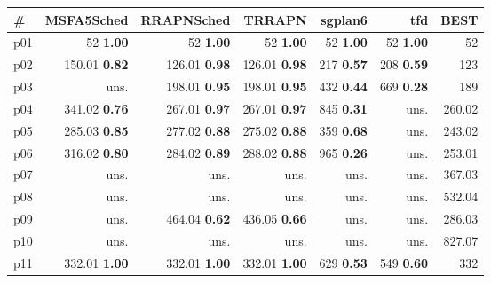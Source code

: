 \begin{tabular}{lrrrrrr}
\toprule
\textbf{\#} & \textbf{MSFA5Sched} & \textbf{RRAPNSched} & \textbf{TRRAPN} & \textbf{sgplan6} & \textbf{tfd} & \textbf{BEST}\\
\midrule
\multicolumn{1}{l|}{p01} & {\footnotesize 52} \textbf{1.00} & {\footnotesize 52} \textbf{1.00} & {\footnotesize 52} \textbf{1.00} & {\footnotesize 52} \textbf{1.00} & {\footnotesize 52} \textbf{1.00} & \multicolumn{1}{|r}{52}\\
\multicolumn{1}{l|}{p02} & {\footnotesize 150.01} \textbf{0.82} & {\footnotesize 126.01} \textbf{0.98} & {\footnotesize 126.01} \textbf{0.98} & {\footnotesize 217} \textbf{0.57} & {\footnotesize 208} \textbf{0.59} & \multicolumn{1}{|r}{123}\\
\multicolumn{1}{l|}{p03} & uns. & {\footnotesize 198.01} \textbf{0.95} & {\footnotesize 198.01} \textbf{0.95} & {\footnotesize 432} \textbf{0.44} & {\footnotesize 669} \textbf{0.28} & \multicolumn{1}{|r}{189}\\
\multicolumn{1}{l|}{p04} & {\footnotesize 341.02} \textbf{0.76} & {\footnotesize 267.01} \textbf{0.97} & {\footnotesize 267.01} \textbf{0.97} & {\footnotesize 845} \textbf{0.31} & uns. & \multicolumn{1}{|r}{260.02}\\
\multicolumn{1}{l|}{p05} & {\footnotesize 285.03} \textbf{0.85} & {\footnotesize 277.02} \textbf{0.88} & {\footnotesize 275.02} \textbf{0.88} & {\footnotesize 359} \textbf{0.68} & uns. & \multicolumn{1}{|r}{243.02}\\
\multicolumn{1}{l|}{p06} & {\footnotesize 316.02} \textbf{0.80} & {\footnotesize 284.02} \textbf{0.89} & {\footnotesize 288.02} \textbf{0.88} & {\footnotesize 965} \textbf{0.26} & uns. & \multicolumn{1}{|r}{253.01}\\
\multicolumn{1}{l|}{p07} & uns. & uns. & uns. & uns. & uns. & \multicolumn{1}{|r}{367.03}\\
\multicolumn{1}{l|}{p08} & uns. & uns. & uns. & uns. & uns. & \multicolumn{1}{|r}{532.04}\\
\multicolumn{1}{l|}{p09} & uns. & {\footnotesize 464.04} \textbf{0.62} & {\footnotesize 436.05} \textbf{0.66} & uns. & uns. & \multicolumn{1}{|r}{286.03}\\
\multicolumn{1}{l|}{p10} & uns. & uns. & uns. & uns. & uns. & \multicolumn{1}{|r}{827.07}\\
\multicolumn{1}{l|}{p11} & {\footnotesize 332.01} \textbf{1.00} & {\footnotesize 332.01} \textbf{1.00} & {\footnotesize 332.01} \textbf{1.00} & {\footnotesize 629} \textbf{0.53} & {\footnotesize 549} \textbf{0.60} & \multicolumn{1}{|r}{332}\\

\end{tabular}
